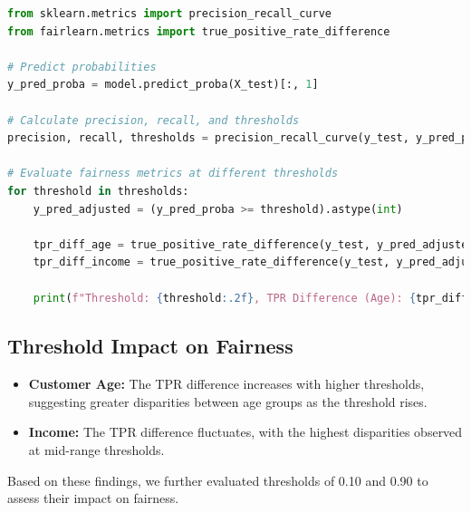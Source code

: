 \documentclass[12pt,a4paper]{report}
\begin{document}
\begin{lstlisting}[language=Python, caption={Threshold Adjustment to Evaluate Fairness Metrics}]
from sklearn.metrics import precision_recall_curve
from fairlearn.metrics import true_positive_rate_difference

# Predict probabilities
y_pred_proba = model.predict_proba(X_test)[:, 1]

# Calculate precision, recall, and thresholds
precision, recall, thresholds = precision_recall_curve(y_test, y_pred_proba)

# Evaluate fairness metrics at different thresholds
for threshold in thresholds:
    y_pred_adjusted = (y_pred_proba >= threshold).astype(int)
    
    tpr_diff_age = true_positive_rate_difference(y_test, y_pred_adjusted, sensitive_features=X_test['customer_age'])
    tpr_diff_income = true_positive_rate_difference(y_test, y_pred_adjusted, sensitive_features=X_test['income'])
    
    print(f"Threshold: {threshold:.2f}, TPR Difference (Age): {tpr_diff_age:.4f}, TPR Difference (Income): {tpr_diff_income:.4f}")
\end{lstlisting}

\subsection{Threshold Impact on Fairness}

\begin{itemize}
    \item \textbf{Customer Age:} The TPR difference increases with higher thresholds, suggesting greater disparities between age groups as the threshold rises.
    
    \item \textbf{Income:} The TPR difference fluctuates, with the highest disparities observed at mid-range thresholds.
\end{itemize}

Based on these findings, we further evaluated thresholds of 0.10 and 0.90 to assess their impact on fairness.\\
\end{document}
